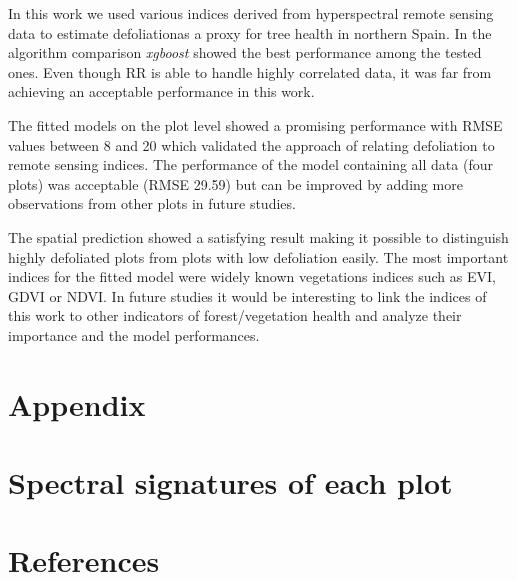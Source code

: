 \documentclass[review]{elsarticle}
\begin{document}
\noindent In this work we used various indices derived from hyperspectral remote sensing data to estimate defoliationas a proxy for tree health in northern Spain.
In the algorithm comparison \textit{xgboost} showed the best performance among the tested ones.
Even though \ac{RR} is able to handle highly correlated data, it was far from achieving an acceptable performance in this work.

The fitted models on the plot level showed a promising performance with RMSE values between 8 and 20 which validated the approach of relating defoliation to remote sensing indices.
The performance of the model containing all data (four plots) was acceptable (RMSE 29.59) but can be improved by adding more observations from other plots in future studies.

The spatial prediction showed a satisfying result making it possible to distinguish highly defoliated plots from plots with low defoliation easily.
The most important indices for the fitted model were widely known vegetations indices such as EVI, GDVI or NDVI.
In future studies it would be interesting to link the indices of this work to other indicators of forest/vegetation health and analyze their importance and the model performances.



\section{Appendix}

\appendix
\gdef\thesection{\Alph{section}} %
\makeatletter
\renewcommand\@seccntformat[1]{Appendix \csname the#1\endcsname.\hspace{0.5em}}
\makeatother

\section{Spectral signatures of each plot}


\pagebreak


\section*{References}


\end{document}
